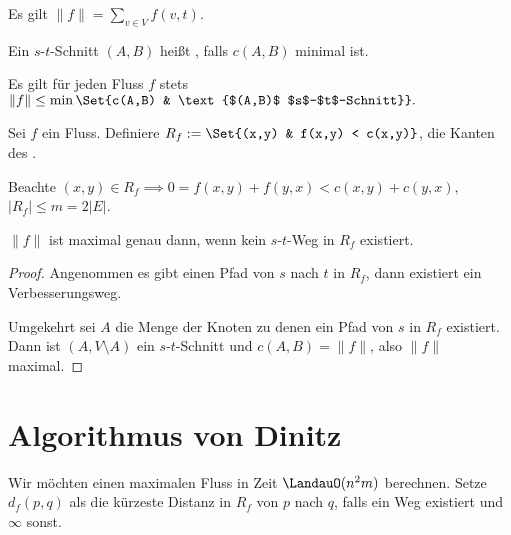 \begin{kor}
    Es gilt
    \begin{math}
        \|f\| = \sum_{v \in V} f(v,t).
    \end{math}
\end{kor}

\begin{df}
    Ein $s$-$t$-Schnitt $(A,B)$ heißt , falls $c(A,B)$ minimal ist.
\end{df}

Es gilt für jeden Fluss $f$ stets
\begin{math}
    \|f\| \le \min \Set{c(A,B) & \text{$(A,B)$ $s$-$t$-Schnitt}}.
\end{math}

\begin{df}
    Sei $f$ ein Fluss.
    Definiere $R_f := \Set{(x,y) & f(x,y) < c(x,y)}$, die Kanten des .
    \begin{note}
        Beachte
        \begin{math}
            (x,y) \in R_f
            \implies
            0 = f(x,y) + f(y,x)
            < c(x,y) + c(y,x),
        \end{math}
        $|R_f| \le m = 2|E|$.
    \end{note}
\end{df}

\begin{lem}
    $\|f\|$ ist maximal genau dann, wenn kein $s$-$t$-Weg in $R_f$ existiert.
    \begin{proof}
        Angenommen es gibt einen Pfad von $s$ nach $t$ in $R_f$, dann existiert ein Verbesserungsweg.

        Umgekehrt sei $A$ die Menge der Knoten zu denen ein Pfad von $s$ in $R_f$ existiert.
        Dann ist $(A, V \setminus A)$ ein $s$-$t$-Schnitt und $c(A,B) = \|f\|$, also $\|f\|$ maximal.
    \end{proof}
\end{lem}




\section{Algorithmus von Dinitz}


Wir möchten einen maximalen Fluss in Zeit $\LandauO(n^2m)$ berechnen.
Setze $d_f(p,q)$ als die kürzeste Distanz in $R_f$ von $p$ nach $q$, falls ein Weg existiert und $\infty$ sonst.

